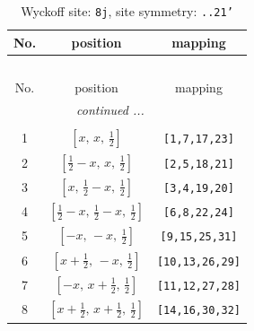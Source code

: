 \documentclass[fleqn,8pt]{jsarticle}
\begin{document}
\begin{longtable}{ccc}
\caption{Wyckoff site: {\tt 8j}, site symmetry: {\tt ..21'}}
 \\
 \hline \hline
No. & position & mapping \\ \hline \endfirsthead

\multicolumn{2}{l}{\tablename\ \thetable{}} \\
 \hline \hline
No. & position & mapping \\ \hline \endhead

 \hline \hline
\multicolumn{2}{r}{\footnotesize\it continued ...} \\ \endfoot

 \hline \hline
\multicolumn{2}{r}{} \\ \endlastfoot

1 & $\left[ x,\, x,\, \frac{1}{2} \right]$ & {\tt [1,7,17,23]} \\ \hline
2 & $\left[ \frac{1}{2} - x,\, x,\, \frac{1}{2} \right]$ & {\tt [2,5,18,21]} \\ \hline
3 & $\left[ x,\, \frac{1}{2} - x,\, \frac{1}{2} \right]$ & {\tt [3,4,19,20]} \\ \hline
4 & $\left[ \frac{1}{2} - x,\, \frac{1}{2} - x,\, \frac{1}{2} \right]$ & {\tt [6,8,22,24]} \\ \hline
5 & $\left[ - x,\, - x,\, \frac{1}{2} \right]$ & {\tt [9,15,25,31]} \\ \hline
6 & $\left[ x + \frac{1}{2},\, - x,\, \frac{1}{2} \right]$ & {\tt [10,13,26,29]} \\ \hline
7 & $\left[ - x,\, x + \frac{1}{2},\, \frac{1}{2} \right]$ & {\tt [11,12,27,28]} \\ \hline
8 & $\left[ x + \frac{1}{2},\, x + \frac{1}{2},\, \frac{1}{2} \right]$ & {\tt [14,16,30,32]} \\
\end{longtable}
\renewcommand{\arraystretch}{1.2}
\end{document}
